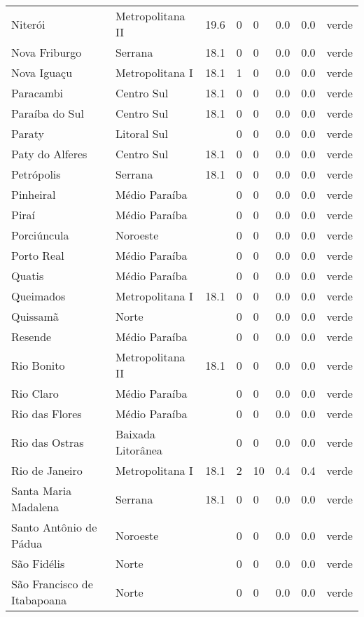 \begin{longtable}{l|lllllll}
  Niterói & Metropolitana II & 19.6 & 0 & 0 & 0.0 & 0.0 & verde \\ 
  Nova Friburgo & Serrana & 18.1 & 0 & 0 & 0.0 & 0.0 & verde \\ 
  Nova Iguaçu & Metropolitana I & 18.1 & 1 & 0 & 0.0 & 0.0 & verde \\ 
  Paracambi & Centro Sul & 18.1 & 0 & 0 & 0.0 & 0.0 & verde \\ 
  Paraíba do Sul & Centro Sul & 18.1 & 0 & 0 & 0.0 & 0.0 & verde \\ 
  Paraty & Litoral Sul &  & 0 & 0 & 0.0 & 0.0 & verde \\ 
  Paty do Alferes & Centro Sul & 18.1 & 0 & 0 & 0.0 & 0.0 & verde \\ 
  Petrópolis & Serrana & 18.1 & 0 & 0 & 0.0 & 0.0 & verde \\ 
  Pinheiral & Médio Paraíba &  & 0 & 0 & 0.0 & 0.0 & verde \\ 
  Piraí & Médio Paraíba &  & 0 & 0 & 0.0 & 0.0 & verde \\ 
  Porciúncula & Noroeste &  & 0 & 0 & 0.0 & 0.0 & verde \\ 
  Porto Real & Médio Paraíba &  & 0 & 0 & 0.0 & 0.0 & verde \\ 
  Quatis & Médio Paraíba &  & 0 & 0 & 0.0 & 0.0 & verde \\ 
  Queimados & Metropolitana I & 18.1 & 0 & 0 & 0.0 & 0.0 & verde \\ 
  Quissamã & Norte &  & 0 & 0 & 0.0 & 0.0 & verde \\ 
  Resende & Médio Paraíba &  & 0 & 0 & 0.0 & 0.0 & verde \\ 
  Rio Bonito & Metropolitana II & 18.1 & 0 & 0 & 0.0 & 0.0 & verde \\ 
  Rio Claro & Médio Paraíba &  & 0 & 0 & 0.0 & 0.0 & verde \\ 
  Rio das Flores & Médio Paraíba &  & 0 & 0 & 0.0 & 0.0 & verde \\ 
  Rio das Ostras & Baixada Litorânea &  & 0 & 0 & 0.0 & 0.0 & verde \\ 
  Rio de Janeiro & Metropolitana I & 18.1 & 2 & 10 & 0.4 & 0.4 & verde \\ 
  Santa Maria Madalena & Serrana & 18.1 & 0 & 0 & 0.0 & 0.0 & verde \\ 
  Santo Antônio de Pádua & Noroeste &  & 0 & 0 & 0.0 & 0.0 & verde \\ 
  São Fidélis & Norte &  & 0 & 0 & 0.0 & 0.0 & verde \\ 
  São Francisco de Itabapoana & Norte &  & 0 & 0 & 0.0 & 0.0 & verde \\ 

\end{longtable}
